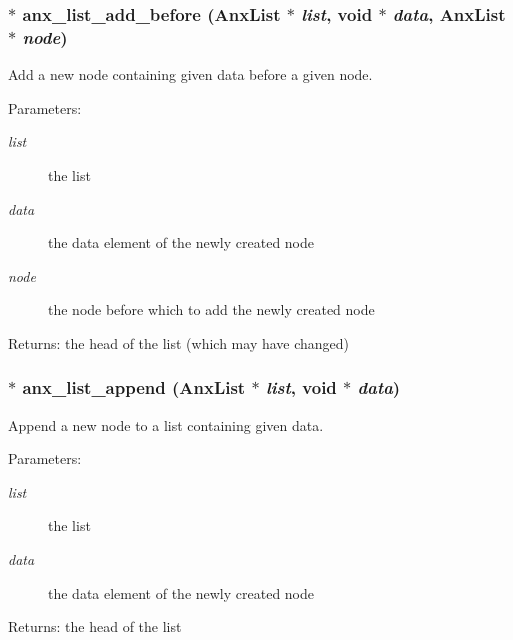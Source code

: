 \subsubsection{$\ast$ anx\_\-list\_\-add\_\-before ({\bf Anx\-List} $\ast$ {\em list}, void $\ast$ {\em data}, {\bf Anx\-List} $\ast$ {\em node})}\label{anx__list_8h_a7}


Add a new node containing given data before a given node. 

\begin{Desc}
\item[Parameters:]
\begin{description}
\item[{\em list}]the list \item[{\em data}]the data element of the newly created node \item[{\em node}]the node before which to add the newly created node \end{description}
\end{Desc}
\begin{Desc}
\item[Returns:]the head of the list (which may have changed) \end{Desc}
\subsubsection{$\ast$ anx\_\-list\_\-append ({\bf Anx\-List} $\ast$ {\em list}, void $\ast$ {\em data})}\label{anx__list_8h_a6}


Append a new node to a list containing given data. 

\begin{Desc}
\item[Parameters:]
\begin{description}
\item[{\em list}]the list \item[{\em data}]the data element of the newly created node \end{description}
\end{Desc}
\begin{Desc}
\item[Returns:]the head of the list \end{Desc}
